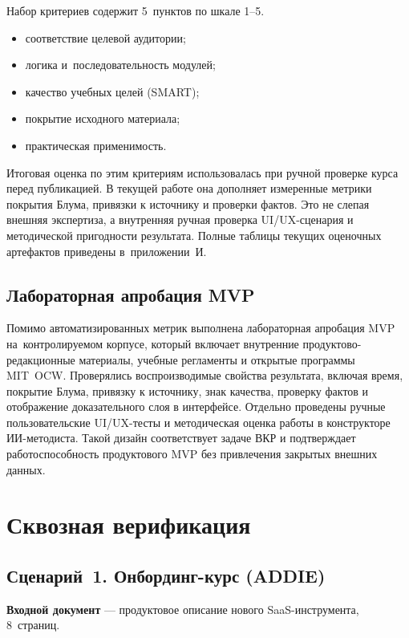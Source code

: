 Набор критериев содержит 5~пунктов по шкале 1–5.

\begin{itemize}
  \item соответствие целевой аудитории;
  \item логика и~последовательность модулей;
  \item качество учебных целей (SMART);
  \item покрытие исходного материала;
  \item практическая применимость.
\end{itemize}

Итоговая оценка по этим критериям использовалась при ручной
проверке курса перед публикацией. В текущей работе она дополняет
измеренные метрики покрытия Блума, привязки к источнику и проверки фактов.
Это не слепая внешняя экспертиза, а внутренняя ручная проверка UI/UX-сценария
и методической пригодности результата. Полные таблицы текущих оценочных
артефактов приведены в~приложении~И.

\subsection{Лабораторная апробация MVP}

Помимо автоматизированных метрик выполнена лабораторная апробация
MVP на~контролируемом корпусе, который включает внутренние продуктово-редакционные
материалы, учебные регламенты и открытые программы MIT~OCW.
Проверялись воспроизводимые свойства результата, включая время, покрытие Блума,
привязку к источнику,
знак качества, проверку фактов и отображение доказательного слоя в интерфейсе.
Отдельно проведены ручные пользовательские UI/UX-тесты и методическая
оценка работы в конструкторе ИИ-методиста.
Такой дизайн соответствует задаче ВКР и подтверждает работоспособность
продуктового MVP без привлечения закрытых внешних данных.

\section{Сквозная верификация}

\subsection{Сценарий~1. Онбординг-курс (ADDIE)}

\textbf{Входной документ} — продуктовое описание нового SaaS-инструмента,
8~страниц.

